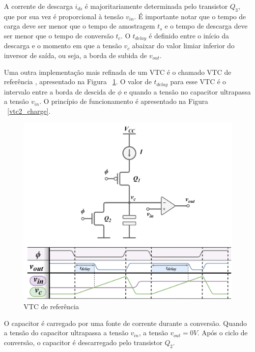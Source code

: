 \documentclass[
	12pt,				%
	openright,			%
	twoside,			%
	a4paper,			%
	english,			%
	french,				%
	spanish,			%
	brazil,				%
	]{abntex2}
\begin{document}
			A corrente de descarga $i_{ds}$ é majoritariamente determinada pelo transistor $Q_3$, que por sua vez é proporcional à tensão $v_{in}$. É importante notar que o tempo de carga deve ser menor que o tempo de amostragem $t_s$ e o tempo de descarga deve ser menor que o tempo de conversão $t_c$. O $t_{delay}$ é definido entre o início da descarga e o momento em que a tensão $v_c$ abaixar do valor limiar inferior do inversor de saída, ou seja, a borda de subida de $v_{out}$.

			Uma outra implementação mais refinada de um VTC é o chamado VTC de referência \cite{Fei}, apresentado na Figura ~\ref{fig:vtc2}. O valor de $t_{delay}$ para esse VTC é o intervalo entre a borda  de descida de $\phi$ e quando a tensão no capacitor ultrapassa a tensão $v_{in}$. O princípio de funcionamento é apresentado na Figura ~\ref{vtc2_charge}.

			\begin{figure}[H]
				\centering
				\includegraphics[width=\linewidth*3/4]{images/VTC_circ2.png}
				\caption{VTC de referência}
				\label{fig:vtc2}
			\end{figure}

			O capacitor é carregado por uma fonte de corrente durante a conversão. Quando a tensão do capacitor ultrapassa a tensão $v_{in}$, a tensão $v_{out}=0 V$. Após o ciclo de conversão, o capacitor é descarregado pelo transistor $Q_2$.
\end{document}
